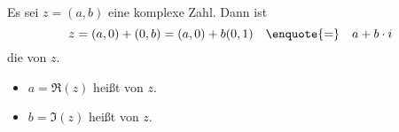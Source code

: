 Es sei $z = (a, b)$ eine komplexe Zahl. Dann ist
$$z = (a, 0) + (0, b) = (a, 0) + b(0, 1) \quad \text{\enquote{=}} \quad a + b \cdot i$$
die  von $z$.
\begin{itemize}
    \item $a = \Re(z)$ heißt  von $z$.
    \item $b = \Im(z)$ heißt  von $z$.
\end{itemize}